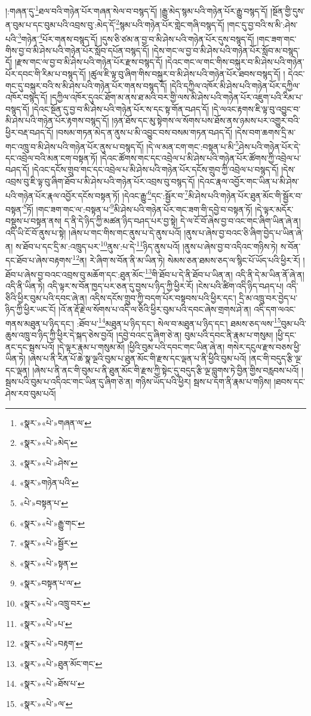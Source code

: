 །:གཞན་དུ་\footnote{«སྣར་»«པེ་»གཞན་ལ་}ཐལ་བའི་གཉེན་པོར་གཞན་སེལ་བ་བསྙད་དོ། །རྒྱུ་མེད་སྙམ་པའི་གཉེན་པོར་རྒྱུ་བསྙད་དོ། །སྔོན་གྱི་དུས་ན་བུམ་པ་དང་བུམ་པའི་འབྲས་བུ་:མེད་དོ་\footnote{«སྣར་»«པེ་»མེད་}སྙམ་པའི་གཉེན་པོར་གླེང་གཞི་བསྙད་དོ། །གང་དུ་བྱ་བའི་ས་མི་:ཤེས་པའི་\footnote{«སྣར་»«པེ་»ཤེས་}གཉེན་\footnote{«སྣར་»གཉེན་པའི་}པོར་གནས་བསྙད་དོ། །དུས་ཅི་ཙམ་ན་བྱ་བ་མི་ཤེས་པའི་གཉེན་པོར་དུས་བསྙད་དོ། །གང་ཟག་གང་གིས་བྱ་བ་མི་ཤེས་པའི་གཉེན་པོར་སློབ་དཔོན་བསྙད་དོ། །དེས་གང་ལ་བྱ་བ་མི་ཤེས་པའི་གཉེན་པོར་སློབ་མ་བསྙད་དོ། །རྫས་གང་ལ་བྱ་བ་མི་ཤེས་པའི་གཉེན་པོར་རྫས་བསྙད་དོ། །དེའང་གང་ལ་གང་གིས་བསྐུར་བ་མི་ཤེས་པའི་གཉེན་པོར་དབང་གི་རིམ་པ་བསྙད་དོ། །ཚུལ་ཇི་ལྟ་བུ་ཞིག་གིས་བསྐུར་བ་མི་ཤེས་པའི་གཉེན་པོར་ཐབས་བསྙད་དོ། །
དེའང་གང་དུ་བསྐུར་བའི་ས་མི་ཤེས་པའི་གཉེན་པོར་གནས་བསྙད་དོ། །དེའི་དཀྱིལ་འཁོར་མི་ཤེས་པའི་གཉེན་པོར་དཀྱིལ་འཁོར་བསྙད་དོ། །དཀྱིལ་འཁོར་དུའང་ཐོག་མ་ནས་ཐ་མའི་བར་གྱི་ལས་མི་ཤེས་པའི་གཉེན་པོར་འཇུག་པའི་རིམ་པ་བསྙད་དོ། །དེའང་སྔོན་དུ་བྱ་བ་མི་ཤེས་པའི་གཉེན་པོར་ས་དང་སྟ་གོན་བཤད་དོ། །དེ་ལའང་རྟགས་ཇི་ལྟ་བུ་འབྱུང་བ་མི་ཤེས་པའི་གཉེན་པོར་རྟགས་བསྙད་དོ། །ཉན་ཐོས་དང་མུ་སྟེགས་ལ་སོགས་པས་ཐོས་ནས་ཉམས་པར་འགྱུར་བའི་ཕྱིར་བརྡ་བཤད་དོ། །བསམ་གཏན་མེད་ན་ནུས་པ་མི་འབྱུང་བས་བསམ་གཏན་བཤད་དོ། །དེས་བག་ཆགས་དྲི་མ་གང་འཁྲུ་བ་མི་ཤེས་པའི་གཉེན་པོར་ནུས་པ་བསྙད་དོ། །དེ་ལ་མན་ངག་གང་:བསྟན་པ་མི་\footnote{«པེ་»བསྟན་པ་}ཤེས་པའི་གཉེན་པོར་དེ་དང་འབྲེལ་བའི་མན་ངག་བསྟན་ཏོ། །དེའང་ཚོགས་གང་དང་འབྲེལ་པ་མི་ཤེས་པའི་གཉེན་པོར་ཚོགས་ཀྱི་འབྲེལ་པ་བཤད་དོ། །དེའང་དངོས་གྲུབ་གང་དང་འབྲེལ་པ་མི་ཤེས་པའི་གཉེན་པོར་དངོས་གྲུབ་ཀྱི་འབྲེལ་པ་བསྙད་དོ། །དེས་འབྲས་བུ་ཇི་ལྟ་བུ་ཞིག་ཐོབ་པ་མི་ཤེས་པའི་གཉེན་པོར་འབྲས་བུ་བསྙད་དོ། །དེའང་རྣལ་འབྱོར་གང་ཡིན་པ་མི་ཤེས་པའི་གཉེན་པོར་རྣལ་འབྱོར་དངོས་བསྟན་ཏོ། །དེའང་རྒྱུ་\footnote{«སྣར་»«པེ་»རྒྱུ་གང་}དང་:སྦྱོར་བ་\footnote{«སྣར་»«པེ་»སྦྱོར་}མི་ཤེས་པའི་གཉེན་པོར་ཐུན་མོང་གི་སྦྱོར་བ་བསྟན་\footnote{«སྣར་»«པེ་»སྟན་}ཏོ། །གང་ཟག་གང་ལ་:བསྟན་པ་\footnote{«སྣར་»བསྟན་པ་ལ་}མི་ཤེས་པའི་གཉེན་པོར་གང་ཟག་གི་དབྱེ་བ་བསྟན་ཏོ། །དེ་ལྟར་མདོར་བསྡུས་པ་བསྟན་ནས། ད་ནི་དེ་ཉིད་ཀྱི་མཚན་ཉིད་བཤད་པར་བྱ་སྟེ། དེ་ལ་ངོ་བོ་ཞེས་བྱ་བ་འང་གང་ཞིག་ཡིན་ཞེ་ན། འདི་ཡི་ངོ་བོ་ནུས་པ་སྟེ། །ཞེས་པ་གང་གིས་གང་ནུས་པ་དེ་ནུས་པའོ། །ནུས་པ་ཞེས་བྱ་བའང་ཅི་ཞིག་བྱེད་པ་ཡིན་ཞེ་ན། ས་ཐོབ་པ་དང་དྲི་མ་:འཁྲུད་པར་\footnote{«སྣར་»«པེ་»འཁྲུ་བར་}ནུས་:པ་དེ་\footnote{«སྣར་»«པེ་»པ་}ཉིད་ནུས་པའོ། །ནུས་པ་ཞེས་བྱ་བ་འདིའང་གཉིས་ཏེ། ས་བོན་དང་ཐོབ་པ་ཞེས་བརྟགས་\footnote{«སྣར་»«པེ་»བརྟག་}ན། རེ་ཞིག་ས་བོན་ནི་མ་ཡིན་ཏེ། སེམས་ཅན་ཐམས་ཅད་ལ་སྙིང་པོ་ཡོད་པའི་ཕྱིར་རོ། །ཐོབ་པ་ཞེས་བྱ་བའང་འབྲས་བུ་མཆོག་དང་:ཐུན་མོང་\footnote{«སྣར་»«པེ་»ཐུན་མོང་གང་}གི་ཐོབ་པ་དེ་ནི་ཐོབ་པ་ཡིན་ན། འདི་ནི་དེ་མ་ཡིན་ནོ་ཞེ་ན། འདི་ནི་ཡིན་ཏེ། འདི་ལྟར་ས་བོན་ཁྱད་པར་ཅན་དུ་བྱས་པ་ཉིད་ཀྱི་ཕྱིར་རོ། །ངེས་པའི་ཚིག་འདི་ཉིད་བཤད་པ། འདི་ཅིའི་ཕྱིར་བུམ་པའི་དབང་ཞེ་ན། འདིས་དངོས་གྲུབ་ཀྱི་བདག་པོར་བསྟབས་པའི་ཕྱིར་དང་། དྲི་མ་འཁྲུ་བར་བྱེད་པ་ཉིད་ཀྱི་ཕྱིར་ཡང་ངོ། །འོ་ན་རྡོ་རྗེ་ལ་སོགས་པ་འདི་ལ་ཅིའི་ཕྱིར་བུམ་པའི་དབང་ཞེས་གྲགས་ཤེ་ན། འདི་དག་ལའང་གནས་མཐུན་པ་ཉིད་དང་། :ཐོབ་པ་\footnote{«སྣར་»«པེ་»ཐོས་པ་}མཐུན་པ་ཉིད་དང་། སེལ་བ་མཐུན་པ་ཉིད་དང་། ཐམས་ཅད་ལས་\footnote{«སྣར་»«པེ་»ལ་}བུམ་པའི་ཆུས་འཁྲུ་བ་ཉིད་ཀྱི་ཕྱིར་དེ་སྐད་ཅེས་བྱའོ། །དབྱེ་བའང་དུ་ཞིག་ཅེ་ན། བུམ་པའི་དབང་ནི་རྣམ་པ་གསུམ། །ཕྱི་དང་ནང་དང་སྦས་པའོ། །དེ་ལྟར་རྣམ་པ་གསུམ་མོ། །ཕྱིའི་བུམ་པའི་དབང་གང་ཡིན་ཞེ་ན། གསེར་དངུལ་རྫས་བཅས་ཕྱི་ཡིན་ཏེ། །ཞེས་པ་ནི་རིན་པོ་ཆེ་སྣ་ལྔའི་བུམ་པ་ཐུན་མོང་གི་རྫས་དང་ལྡན་པ་ནི་ཕྱིའི་བུམ་པའོ། །ནང་གི་བདུད་རྩི་ལྔ་དང་ལྡན། །ཞེས་པ་ནི་ནང་གི་བུམ་པ་ནི་ཐུན་མོང་གི་རྫས་ཀྱི་སྟེང་དུ་བདུད་རྩི་ལྔ་བླུགས་ཏེ་བྱིན་གྱིས་བརླབས་པའོ། །སྦས་པའི་བུམ་པ་འདིའང་གང་ཡིན་དུ་ཞིག་ཅེ་ན། གཉིས་ཡོད་པའི་ཕྱིར། སྦས་པ་དག་ནི་རྣམ་པ་གཉིས། །ཐབས་དང་ཤེས་རབ་བུམ་པའོ། 